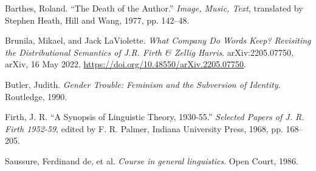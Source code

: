 \documentclass[
  12pt,
]{article}
\newlength{\cslhangindent}
\newlength{\cslentryspacingunit} %
\newenvironment{CSLReferences}[2] %
 {%
  \setlength{\parindent}{0pt}
  \ifodd #1
  \let\oldpar\par
  \def\par{\hangindent=\cslhangindent\oldpar}
  \fi
  \setlength{\parskip}{#2\cslentryspacingunit}
 }%
 {}
\begin{document}
\hypertarget{refs}{}
\begin{CSLReferences}{1}{0}
\leavevmode{}%
Barthes, Roland. {``The {Death} of the {Author}.''} \emph{Image,
{Music}, {Text}}, translated by Stephen Heath, {Hill and Wang}, 1977,
pp. 142--48.

\leavevmode{}%
Brunila, Mikael, and Jack LaViolette. \emph{What Company Do Words Keep?
{Revisiting} the Distributional Semantics of {J}.{R}. {Firth} \& {Zellig
Harris}}. arXiv:2205.07750, {arXiv}, 16 May 2022,
\url{https://doi.org/10.48550/arXiv.2205.07750}.

\leavevmode{}%
Butler, Judith. \emph{Gender {Trouble}: {Feminism} and the {Subversion}
of {Identity}}. {Routledge}, 1990.

\leavevmode{}%
Firth, J. R. {``A Synopsis of Linguistic Theory, 1930-55.''}
\emph{Selected {Papers} of {J}. {R}. {Firth} 1952-59}, edited by F. R.
Palmer, {Indiana University Press}, 1968, pp. 168--205.

\leavevmode{}%
Saussure, Ferdinand de, et al. \emph{Course in general linguistics}.
{Open Court}, 1986.

\end{CSLReferences}
\end{document}
